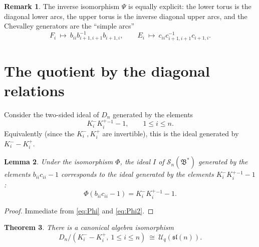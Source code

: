 \documentclass[11pt]{amsart}
\newcommand{\U}{\mathscr U}
\newcommand{\sl}{\mathfrak{sl}}
\newcommand{\KP}{K^{+}}
\newcommand{\KM}{K^{-}}
\theoremstyle{plain}
\newtheorem{theorem}{Theorem}[section]
\newtheorem{lemma}[theorem]{Lemma}
\theoremstyle{definition}
\newtheorem{remark}[theorem]{Remark}
\numberwithin{equation}{section}
\begin{document}
\begin{remark}
The inverse isomorphism $\Psi$ is equally explicit: the lower torus is the
diagonal lower arcs, the upper torus is the inverse diagonal upper arcs, and
the Chevalley generators are the ``simple arcs''
\[
F_i\ \longmapsto\ b_{ii}b_{i+1,i+1}^{-1}b_{i+1,i},\qquad
E_i\ \longmapsto\ c_{ii}c_{i+1,i+1}^{-1}c_{i+1,i}.
\]
\end{remark}

\section{The quotient by the diagonal relations}\label{sec:quotient}

Consider the two-sided ideal of $D_n$ generated by the elements
\[
\KM_i\KP_i^{-1}-1,\qquad 1\le i\le n.
\]
Equivalently (since the $\KM_i,\KP_i$ are invertible), this is the ideal
generated by $\KM_i-\KP_i$.

\begin{lemma}\label{lem:quotient-ideal}
Under the isomorphism $\Phi$, the ideal $I$ of
$\mathscr S_n(\mathfrak B^*)$ generated by the elements $b_{ii}c_{ii}-1$
corresponds to the ideal generated by the elements $\KM_i\KP_i^{-1}-1$:
\[
\Phi(b_{ii}c_{ii}-1)=\KM_i\KP_i^{-1}-1 .
\]
\end{lemma}

\begin{proof}
Immediate from \eqref{eq:Phi} and \eqref{eq:Phi2}.
\end{proof}

\begin{theorem}\label{thm:quotient}
There is a canonical algebra isomorphism
\[
D_n/(\KM_i-\KP_i,\ 1\le i\le n)\ \cong\ \U_q(\sl(n)).
\]
\end{theorem}
\end{document}
